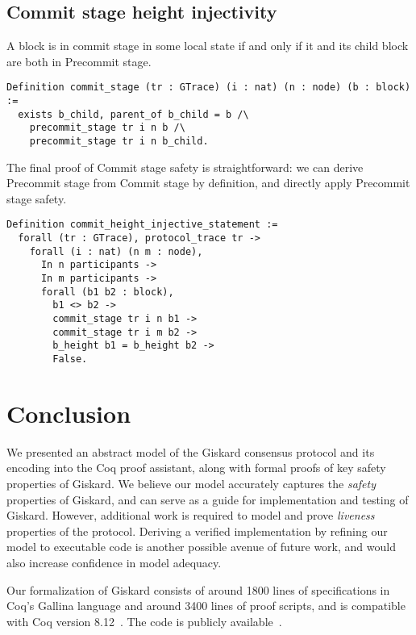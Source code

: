 \documentclass{easychair}
\begin{document}
\subsection{Commit stage height injectivity}
A block is in commit stage in some local state if and only if it and its child block are both in Precommit stage.
\begin{lstlisting}
Definition commit_stage (tr : GTrace) (i : nat) (n : node) (b : block) :=
  exists b_child, parent_of b_child = b /\
    precommit_stage tr i n b /\ 
    precommit_stage tr i n b_child.
\end{lstlisting}
The final proof of Commit stage safety is straightforward: we can derive Precommit stage from Commit stage by definition, and directly apply Precommit stage safety. 
\begin{lstlisting}
Definition commit_height_injective_statement :=
  forall (tr : GTrace), protocol_trace tr ->
    forall (i : nat) (n m : node),
      In n participants ->
      In m participants ->
      forall (b1 b2 : block),
        b1 <> b2 -> 
        commit_stage tr i n b1 ->
        commit_stage tr i m b2 -> 
        b_height b1 = b_height b2 ->
        False. 
\end{lstlisting}
\section{Conclusion}
\label{sec:conclusion}

We presented an abstract model of the Giskard consensus protocol and its encoding into the Coq proof assistant, along with formal proofs of key safety properties of Giskard.
%
We believe our model accurately captures the \emph{safety} properties of Giskard, and can serve as a guide for implementation and testing of Giskard. However, additional work is required to model and prove \emph{liveness} properties of the protocol. Deriving a verified implementation by refining our model to executable code is another possible avenue of future work, and would also increase confidence in model adequacy.

Our formalization of Giskard consists of around 1800 lines of specifications in Coq's Gallina language and around 3400 lines of proof scripts, and is compatible with Coq version 8.12~\cite{Coq812}. The code is publicly available~\cite{CoqGiskard}.



\end{document}
